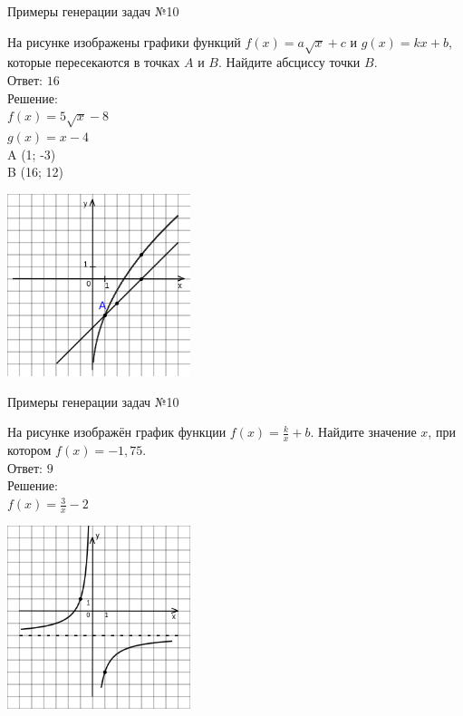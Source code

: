 \documentclass[aspectratio=169]{beamer}
\begin{document}
\begin{frame}{Примеры генерации задач №10}
    \begin{multicols}{2}
          
        На рисунке изображены графики функций $f (x)=a\sqrt{x}+c$ и $g (x)=kx+b$, которые пересекаются в точках $A$ и $B$. Найдите абсциссу точки $B$.\\
        
        Ответ: $16$\\

        Решение: \\
        $f (x)=5\sqrt{x}-8$\\
        $g (x)=x-4$\\
        A (1; -3)\\
        B (16; 12)


        \includegraphics[width=0.4\textwidth]{images/230486231093499n0}
    \end{multicols}
         
\end{frame}

\begin{frame}{Примеры генерации задач №10}
    \begin{multicols}{2}
        На рисунке изображён график функции $f (x)=\frac{k}{x}+b$. Найдите значение $x$, при котором $f (x)=-1,75$.\\

        Ответ: $9$\\

        Решение: \\
        $f (x)=\frac{3}{x}-2$

        \includegraphics[width=0.4\textwidth]{images/5535657652049n0.png}
    \end{multicols}
    
\end{frame}
\end{document}
